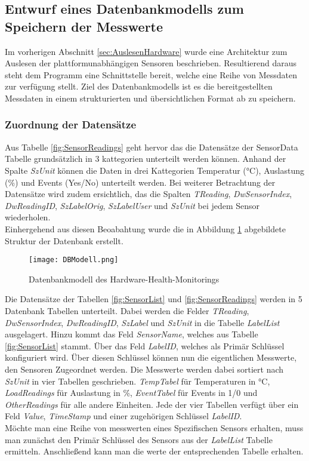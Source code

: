 \subsection{Entwurf eines Datenbankmodells zum Speichern der Messwerte}
Im vorherigen Abschnitt \ref{sec:AuslesenHardware} wurde eine Architektur zum Auslesen der plattformunabhängigen Sensoren beschrieben. Resultierend daraus steht dem Programm eine Schnittstelle bereit, welche eine Reihe von Messdaten zur verfügung stellt. Ziel des Datenbankmodells ist es die bereitgestellten Messdaten in einem strukturierten und übersichtlichen Format ab zu speichern.\\

\subsubsection*{Zuordnung der Datensätze}
Aus Tabelle \ref{fig:SensorReadings} geht hervor das die Datensätze der SensorData Tabelle grundsätzlich in 3 kattegorien unterteilt werden können. Anhand der Spalte \textit{SzUnit} können die Daten in drei Kattegorien Temperatur (°C), Auslastung (\%) und Events (Yes/No) unterteilt werden. Bei weiterer Betrachtung der Datensätze wird zudem ersichtlich, das die Spalten \textit{TReading}, \textit{DwSensorIndex}, \textit{DwReadingID}, \textit{SzLabelOrig}, \textit{SzLabelUser} und \textit{SzUnit} bei jedem Sensor wiederholen.\\
Einhergehend aus diesen Beoabahtung wurde die in Abbildung \ref{fig:DBModell} abgebildete Struktur der Datenbank erstellt. 
\begin{center}
    \begin{figure}[h!]
        \centering
        \texttt{[image: DBModell.png]}
        \caption{Datenbankmodell des Hardware-Health-Monitorings}
        \label{fig:DBModell}
    \end{figure}
\end{center}
\vspace{-1.8cm}
Die Datensätze der Tabellen \ref{fig:SensorList} und \ref{fig:SensorReadings} werden in 5 Datenbank Tabellen unterteilt. Dabei werden die Felder \textit{TReading}, \textit{DwSensorIndex}, \textit{DwReadingID}, \textit{SzLabel} und \textit{SzUnit} in die Tabelle \textit{LabelList} ausgelagert. Hinzu kommt das Feld \textit{SensorName}, welches aus Tabelle \ref{fig:SensorList} stammt. Über das Feld \textit{LabelID}, welches als Primär Schlüssel konfiguriert wird. Über diesen Schlüssel können nun die eigentlichen Messwerte, den Sensoren Zugeordnet werden. Die Messwerte werden dabei sortiert nach \textit{SzUnit} in vier Tabellen geschrieben. \textit{TempTabel} für Temperaturen in  °C, \textit{LoadReadings} für Auslastung in \%, \textit{EventTabel} für Events in 1/0 und \textit{OtherReadings} für alle andere Einheiten. Jede der vier Tabellen verfügt über ein Feld \textit{Value}, \textit{TimeStamp} und einer zugehörigen Schlüssel \textit{LabelID}.\\
Möchte man eine Reihe von messwerten eines Spezifischen Sensors erhalten, muss man zunächst den Primär Schlüssel des Sensors aus der \textit{LabelList} Tabelle ermitteln. Anschließend kann man die werte der entsprechenden Tabelle erhalten.

